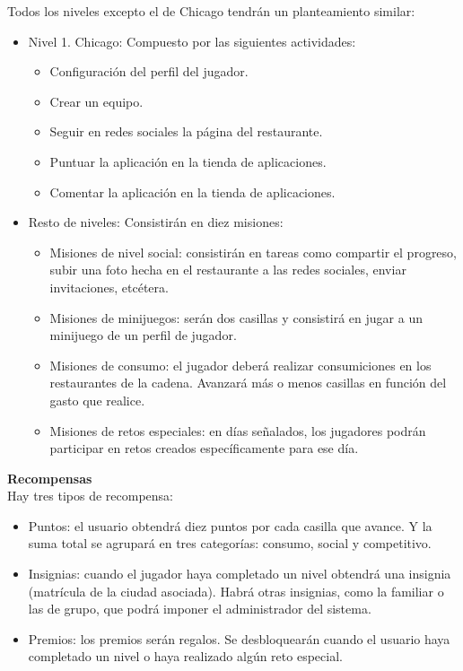 \documentclass[twoside]{report}
\begin{document}
Todos los niveles excepto el de Chicago tendrán un planteamiento similar:
\begin{itemize}
\item Nivel 1. Chicago: Compuesto por las siguientes actividades:
	\begin{itemize}
		\item Configuración del perfil del jugador.
		\item Crear un equipo.
		\item Seguir en redes sociales la página del restaurante.
		\item Puntuar la aplicación en la tienda de aplicaciones.
		\item Comentar la aplicación en la tienda de aplicaciones.
	\end{itemize}
\item Resto de niveles: Consistirán en diez misiones:
	\begin{itemize}
		\item Misiones de nivel social: consistirán en tareas como compartir el progreso, subir una foto hecha en el restaurante a las redes sociales, enviar invitaciones, etcétera.
		
		\item Misiones de minijuegos: serán dos casillas y consistirá en jugar a un minijuego de un perfil de jugador.
		
		\item Misiones de consumo: el jugador deberá realizar consumiciones en los restaurantes de la cadena. Avanzará más o menos casillas en función del gasto que realice.
		
		\item Misiones de retos especiales: en días señalados, los jugadores podrán participar en retos creados específicamente para ese día.
	\end{itemize}
\end{itemize}
\vspace{1cm}
\textbf{Recompensas}\\

Hay tres tipos de recompensa:
\begin{itemize}

\item Puntos: el usuario obtendrá diez puntos por cada casilla que avance. Y la suma total se agrupará en tres categorías: consumo, social y competitivo.

\item Insignias: cuando el jugador haya completado un nivel obtendrá una insignia (matrícula de la ciudad asociada). Habrá otras insignias, como la familiar o las de grupo, que podrá imponer el administrador del sistema.

\item Premios: los premios serán regalos. Se desbloquearán cuando el usuario haya completado un nivel o haya realizado algún reto especial.

\end{itemize}
\end{document}
